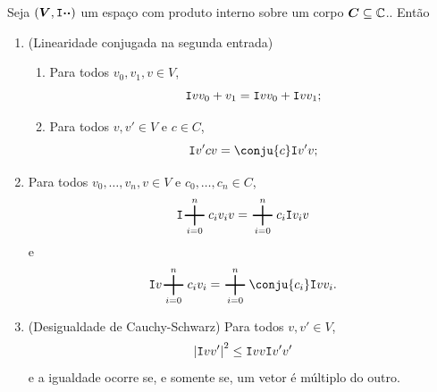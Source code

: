 \begin{prop}
Seja $(\bm V,\mathtt I{\bm{\cdot}}{\bm{\cdot}})$ um espaço com produto interno sobre um corpo $\bm C \subseteq \mathbb{C}$.. Então
	\begin{enumerate}
	\item (Linearidade conjugada na segunda entrada)
		\begin{enumerate}
		\item Para todos $v_0,v_1,v \in V$,
			\begin{equation*}
			\mathtt I{v}{v_0+v_1} = \mathtt I{v}{v_0} + \mathtt I{v}{v_1};
			\end{equation*}
		\item Para todos $v,v' \in V$ e $c \in C$,
			\begin{equation*}
			\inte{v'}{cv} = \conju{c}\inte{v'}{v};
			\end{equation*}
		\end{enumerate}
	\item Para todos $v_0,\ldots,v_n,v \in V$ e $c_0,\ldots,c_n \in C$,
		\begin{equation*}
		\inte{\sum_{i=0}^n c_iv_i}{v} = \sum_{i=0}^n c_i\inte{v_i}{v}
		\end{equation*}
e
		\begin{equation*}
		\inte{v}{\sum_{i=0}^n c_iv_i} = \sum_{i=0}^n \conju{c_i}\inte{v}{v_i}.
		\end{equation*}
	\item (Desigualdade de Cauchy-Schwarz) Para todos $v,v' \in V$,
		\begin{equation*}
		\left\vert{\mathtt I{v}{v'}}\right\vert^2 \leq \mathtt I{v}{v}\mathtt I{v'}{v'}
		\end{equation*}
		e a igualdade ocorre se, e somente se, um vetor é múltiplo do outro.
		\end{enumerate}
\end{prop}
